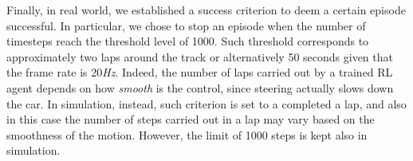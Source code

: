 Finally, in real world, we established a success criterion to deem a certain episode successful. In particular, we chose to stop an episode when the number of timesteps reach the threshold level of 1000. Such threshold corresponds to approximately two laps around the track or alternatively 50 seconds given that the frame rate is 20\textit{Hz}. Indeed, the number of laps carried out by a trained RL agent depends on how \textit{smooth} is the control, since steering actually slows down the car. In simulation, instead, such criterion is set to a completed a lap, and also in this case the number of steps carried out in a lap may vary based on the smoothness of the motion. However, the limit of 1000 steps is kept also in simulation.

%
%
